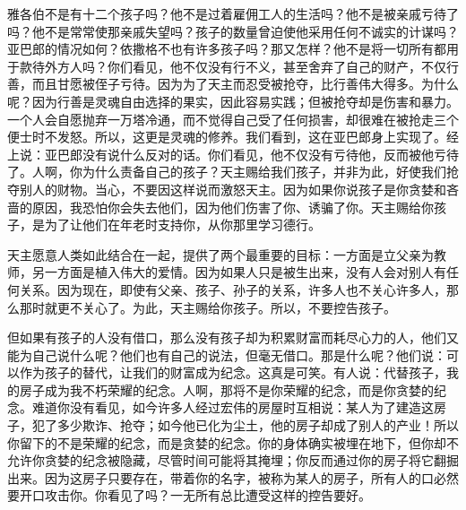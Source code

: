 雅各伯不是有十二个孩子吗？他不是过着雇佣工人的生活吗？他不是被亲戚亏待了吗？他不是常常使那亲戚失望吗？孩子的数量曾迫使他采用任何不诚实的计谋吗？亚巴郎的情况如何？依撒格不也有许多孩子吗？那又怎样？他不是将一切所有都用于款待外方人吗？你们看见，他不仅没有行不义，甚至舍弃了自己的财产，不仅行善，而且甘愿被侄子亏待。因为为了天主而忍受被抢夺，比行善伟大得多。为什么呢？因为行善是灵魂自由选择的果实，因此容易实践；但被抢夺却是伤害和暴力。一个人会自愿抛弃一万塔冷通，而不觉得自己受了任何损害，却很难在被抢走三个便士时不发怒。所以，这更是灵魂的修养。我们看到，这在亚巴郎身上实现了。经上说：亚巴郎没有说什么反对的话。你们看见，他不仅没有亏待他，反而被他亏待了。人啊，你为什么责备自己的孩子？天主赐给我们孩子，并非为此，好使我们抢夺别人的财物。当心，不要因这样说而激怒天主。因为如果你说孩子是你贪婪和吝啬的原因，我恐怕你会失去他们，因为他们伤害了你、诱骗了你。天主赐给你孩子，是为了让他们在年老时支持你，从你那里学习德行。\par

天主愿意人类如此结合在一起，提供了两个最重要的目标：一方面是立父亲为教师，另一方面是植入伟大的爱情。因为如果人只是被生出来，没有人会对别人有任何关系。因为现在，即使有父亲、孩子、孙子的关系，许多人也不关心许多人，那么那时就更不关心了。为此，天主赐给你孩子。所以，不要控告孩子。\par

但如果有孩子的人没有借口，那么没有孩子却为积累财富而耗尽心力的人，他们又能为自己说什么呢？他们也有自己的说法，但毫无借口。那是什么呢？他们说：可以作为孩子的替代，让我们的财富成为纪念。这真是可笑。有人说：代替孩子，我的房子成为我不朽荣耀的纪念。人啊，那将不是你荣耀的纪念，而是你贪婪的纪念。难道你没有看见，如今许多人经过宏伟的房屋时互相说：某人为了建造这房子，犯了多少欺诈、抢夺；如今他已化为尘土，他的房子却成了别人的产业！所以你留下的不是荣耀的纪念，而是贪婪的纪念。你的身体确实被埋在地下，但你却不允许你贪婪的纪念被隐藏，尽管时间可能将其掩埋；你反而通过你的房子将它翻掘出来。因为这房子只要存在，带着你的名字，被称为某人的房子，所有人的口必然要开口攻击你。你看见了吗？一无所有总比遭受这样的控告要好。\par

